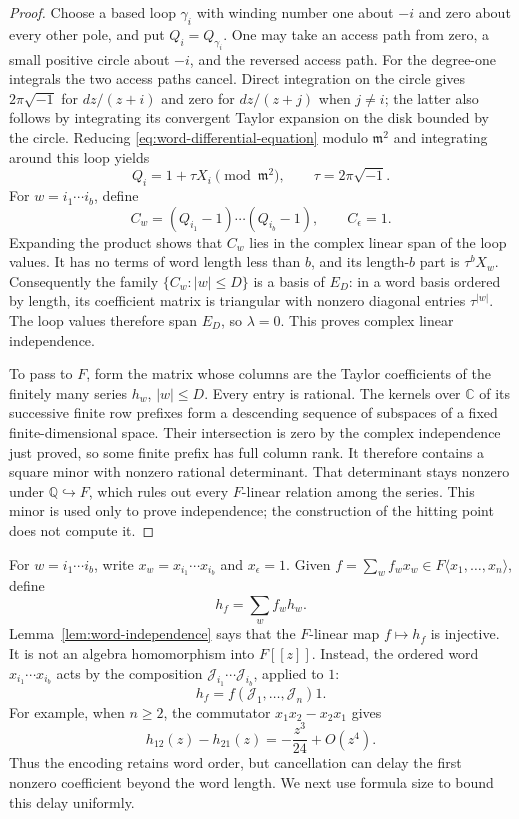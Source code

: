 \begin{proof}
Choose a based loop $\gamma_i$ with winding number one about $-i$
and zero about every other pole, and put $Q_i=Q_{\gamma_i}$.
One may take an access path from zero, a small positive circle about
$-i$, and the reversed access path. For the degree-one integrals the
two access paths cancel. Direct integration on the circle gives
$2\pi\sqrt{-1}$ for $dz/(z+i)$ and zero for $dz/(z+j)$ when $j\ne i$;
the latter also follows by integrating its convergent Taylor expansion
on the disk bounded by the circle.
Reducing \eqref{eq:word-differential-equation} modulo $\mathfrak m^2$
and integrating around this loop yields
\[
  Q_i=1+\tau X_i\pmod{\mathfrak m^2},
  \qquad \tau=2\pi\sqrt{-1}.
\]
For $w=i_1\cdots i_b$, define
\[
  C_w=(Q_{i_1}-1)\cdots(Q_{i_b}-1),
  \qquad C_\epsilon=1.
\]
Expanding the product shows that $C_w$ lies in the complex linear span
of the loop values.
It has no terms of word length less than $b$, and its length-$b$ part
is $\tau^b X_w$.
Consequently the family $\{C_w:|w|\leq D\}$ is a basis of $E_D$:
in a word basis ordered by length, its coefficient matrix is triangular
with nonzero diagonal entries $\tau^{|w|}$.
The loop values therefore span $E_D$, so $\lambda=0$.
This proves complex linear independence.

To pass to $F$, form the matrix whose columns are the Taylor
coefficients of the finitely many series $h_w$, $|w|\leq D$.
Every entry is rational.
The kernels over $\mathbb C$ of its successive finite row prefixes
form a descending sequence of subspaces of a fixed finite-dimensional
space.
Their intersection is zero by the complex independence just proved,
so some finite prefix has full column rank.
It therefore contains a square minor with nonzero rational determinant.
That determinant stays nonzero under $\mathbb Q\hookrightarrow F$,
which rules out every $F$-linear relation among the series.
This minor is used only to prove independence; the construction of
the hitting point does not compute it.
\end{proof}

For $w=i_1\cdots i_b$, write $x_w=x_{i_1}\cdots x_{i_b}$ and
$x_\epsilon=1$.
Given $f=\sum_w f_w x_w\in F\langle x_1,\ldots,x_n\rangle$, define
\begin{equation}
  h_f=\sum_w f_w h_w.
  \label{eq:polynomial-series}
\end{equation}
Lemma~\ref{lem:word-independence} says that the $F$-linear map
$f\mapsto h_f$ is injective.
It is not an algebra homomorphism into $F[[z]]$.
Instead, the ordered word $x_{i_1}\cdots x_{i_b}$ acts by the composition
$\mathcal J_{i_1}\cdots\mathcal J_{i_b}$, applied to $1$:
\begin{equation}
  h_f=f(\mathcal J_1,\ldots,\mathcal J_n)1.
  \label{eq:operator-evaluation}
\end{equation}
For example, when $n\ge2$, the commutator $x_1x_2-x_2x_1$ gives
\[
 h_{12}(z)-h_{21}(z)=-\frac{z^3}{24}+O(z^4).
\]
Thus the encoding retains word order, but cancellation can delay the first
nonzero coefficient beyond the word length. We next use formula size to
bound this delay uniformly.
